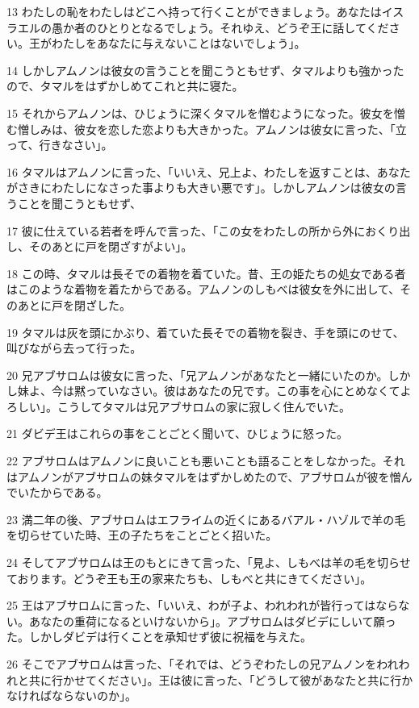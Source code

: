 \par 13 わたしの恥をわたしはどこへ持って行くことができましょう。あなたはイスラエルの愚か者のひとりとなるでしょう。それゆえ、どうぞ王に話してください。王がわたしをあなたに与えないことはないでしょう」。
\par 14 しかしアムノンは彼女の言うことを聞こうともせず、タマルよりも強かったので、タマルをはずかしめてこれと共に寝た。
\par 15 それからアムノンは、ひじょうに深くタマルを憎むようになった。彼女を憎む憎しみは、彼女を恋した恋よりも大きかった。アムノンは彼女に言った、「立って、行きなさい」。
\par 16 タマルはアムノンに言った、「いいえ、兄上よ、わたしを返すことは、あなたがさきにわたしになさった事よりも大きい悪です」。しかしアムノンは彼女の言うことを聞こうともせず、
\par 17 彼に仕えている若者を呼んで言った、「この女をわたしの所から外におくり出し、そのあとに戸を閉ざすがよい」。
\par 18 この時、タマルは長そでの着物を着ていた。昔、王の姫たちの処女である者はこのような着物を着たからである。アムノンのしもべは彼女を外に出して、そのあとに戸を閉ざした。
\par 19 タマルは灰を頭にかぶり、着ていた長そでの着物を裂き、手を頭にのせて、叫びながら去って行った。
\par 20 兄アブサロムは彼女に言った、「兄アムノンがあなたと一緒にいたのか。しかし妹よ、今は黙っていなさい。彼はあなたの兄です。この事を心にとめなくてよろしい」。こうしてタマルは兄アブサロムの家に寂しく住んでいた。
\par 21 ダビデ王はこれらの事をことごとく聞いて、ひじょうに怒った。
\par 22 アブサロムはアムノンに良いことも悪いことも語ることをしなかった。それはアムノンがアブサロムの妹タマルをはずかしめたので、アブサロムが彼を憎んでいたからである。
\par 23 満二年の後、アブサロムはエフライムの近くにあるバアル・ハゾルで羊の毛を切らせていた時、王の子たちをことごとく招いた。
\par 24 そしてアブサロムは王のもとにきて言った、「見よ、しもべは羊の毛を切らせております。どうぞ王も王の家来たちも、しもべと共にきてください」。
\par 25 王はアブサロムに言った、「いいえ、わが子よ、われわれが皆行ってはならない。あなたの重荷になるといけないから」。アブサロムはダビデにしいて願った。しかしダビデは行くことを承知せず彼に祝福を与えた。
\par 26 そこでアブサロムは言った、「それでは、どうぞわたしの兄アムノンをわれわれと共に行かせてください」。王は彼に言った、「どうして彼があなたと共に行かなければならないのか」。
